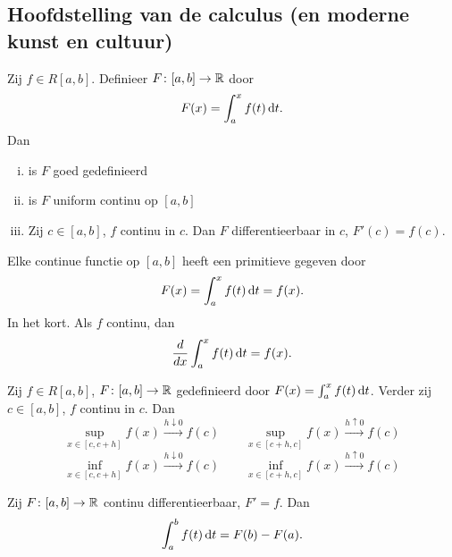 \documentclass{2wa40summary}
\begin{document}
		\subsection{Hoofdstelling van de calculus (en moderne kunst en cultuur)}
			\begin{theorem}
				Zij $f \in R[a,b]$. Definieer $ F\colon [a,b] \to \mathbb{R} $ door 
				\[ 
					F(x)=\int_a^x f(t)\mathop{}\!\mathrm{d} t.
				 \]
				 Dan
				 \begin{enumerate}[(i)]
				 	\item is $F$ goed gedefinieerd
				 	\item is $F$ uniform continu op $ [a,b] $
				 	\item Zij $ c \in [a,b] $, $f$ continu in $c$. Dan $F$ differentieerbaar in $c$, $ F'(c)=f(c) $.
				 \end{enumerate}
			\end{theorem}
			
			\begin{gevolg}
				Elke continue functie op $ [a,b] $ heeft een primitieve gegeven door 
				\[ 
					F(x)= \int_a^x f(t)\mathop{}\!\mathrm{d} t = f(x).
				 \]
				 In het kort. Als $f$ continu, dan 
				 \[ 
					 \frac{d}{dx} \int_a^x f(t)\mathop{}\!\mathrm{d} t = f(x).
				  \]
			\end{gevolg}
			
			\begin{lemma}
				Zij $ f \in R[a,b] $, $F\colon [a,b] \to \mathbb{R}$ gedefinieerd door $ F(x) = \int_a^x f(t)\mathop{}\!\mathrm{d} t $. Verder zij $ c \in [a,b] $, $f$ continu in $c$. Dan
				\[ 
					\sup_{x \in [c,c+h]} f(x) \xrightarrow{h \downarrow 0} f(c)
					\qquad
					\sup_{x \in [c+h,c]} f(x) \xrightarrow{h \uparrow 0} f(c)
				 \]
				 \[ 
					\inf_{x \in [c,c+h]} f(x) \xrightarrow{h \downarrow 0} f(c)
					\qquad
					\inf_{x \in [c+h,c]} f(x) \xrightarrow{h \uparrow 0} f(c)
				  \]
			\end{lemma}
			
			\begin{theorem}
				Zij $ F\colon [a,b] \to \mathbb{R} $ continu differentieerbaar, $ F'=f $. Dan
				\[ 
					\int_a^b f(t)\mathop{}\!\mathrm{d} t = F(b)-F(a).
				 \]
			\end{theorem}
			
\end{document}
